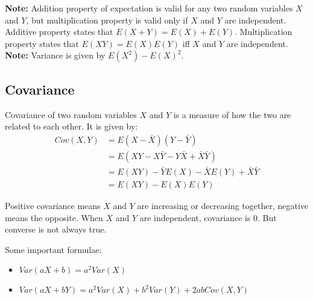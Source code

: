 \documentclass{article}
\begin{document}
\textbf{Note:} Addition property of expectation is valid for any two random variables $X$ and $Y$, but multiplication
  property is valid only if $X$ and $Y$ are independent. Additive property states that $ E(X+Y) = E(X) + E(Y) $.
  Multiplication property states that $ E(XY) = E(X)E(Y) $ iff $X$ and $Y$ are independent.
\textbf{Note: } Variance is given by $ E(X^{2}) - E(X)^{2} $.

\subsection{Covariance}
\begin{definition}[Covariance]
    Covariance of two random variables $X$ and $Y$ is a measure of how the two are related to each other. It is given by:
    \begin{equation*}
        \begin{split}
            Cov(X, Y) & = E(X - \bar{X})(Y - \bar{Y}) \\
            & = E(XY - X\bar{Y} - Y\bar{X} + \bar{X}\bar{Y})  \\
            & = E(XY) - \bar{Y}E(X) - \bar{X}E(Y) + \bar{X}\bar{Y} \\
            & = E(XY) - E(X)E(Y)
        \end{split}
    \end{equation*}
\end{definition}
Positive covariance means $X$ and $Y$ are increasing or decreasing together, negative means the opposite.
When $X$ and $Y$ are independent, covariance is 0. But converse is not always true.

Some important formulae:
\begin{itemize}
  \item $ Var(aX+b) = a^{2}Var(X) $
  \item $ Var(aX+bY) = a^{2}Var(X) + b^{2}Var(Y) + 2abCov(X, Y) $
\end{itemize}
\end{document}
